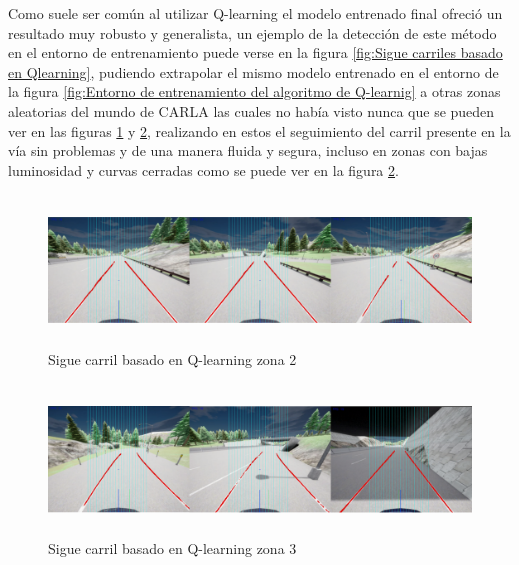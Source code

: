 Como suele ser común al utilizar Q-learning el modelo entrenado final ofreció un resultado muy robusto y generalista, un ejemplo de la detección de este método en el entorno de entrenamiento puede verse en la figura \ref{fig:Sigue carriles basado en Qlearning}, pudiendo extrapolar el mismo modelo entrenado en el entorno de la figura \ref{fig:Entorno de entrenamiento del algoritmo de Q-learnig} a otras zonas aleatorias del mundo de CARLA las cuales no había visto nunca que se pueden ver en las figuras \ref{fig:Sigue carriles basado en Qlearning circuito 2} y \ref{fig:Sigue carriles basado en Qlearning circuito 3}, realizando en estos el seguimiento del carril presente en la vía sin problemas y de una manera fluida y segura, incluso en zonas con bajas luminosidad y curvas cerradas como se puede ver en la figura \ref{fig:Sigue carriles basado en Qlearning circuito 3}.

\bigskip

  \begin{figure}[h]
    \centering
    \includegraphics[height=4cm]{imagenes/cap4/demostraciones_qlearning/normal/qlearning_general/circuito_2/demostracion_escenario_1.pdf}
    \caption{Sigue carril basado en Q-learning zona 2 }
    \label{fig:Sigue carriles basado en Qlearning circuito 2}
\end{figure}

  \begin{figure}[h]
    \centering
    \includegraphics[height=4cm]{imagenes/cap4/demostraciones_qlearning/normal/qlearning_general/circuito_1/demostracion_escenario_2.pdf}
    \caption{Sigue carril basado en Q-learning zona 3}
    \label{fig:Sigue carriles basado en Qlearning circuito 3}
\end{figure}

